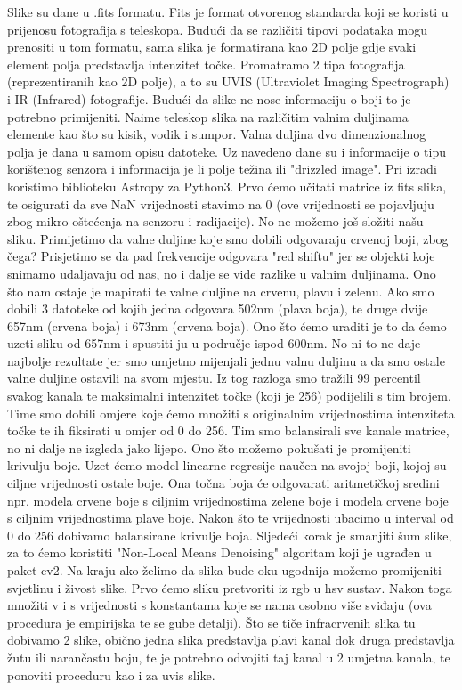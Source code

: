\documentclass[conference]{IEEEtran}
\begin{document}
Slike su dane u .fits formatu. Fits je format otvorenog standarda koji se koristi u prijenosu fotografija s teleskopa. Budući da se različiti tipovi podataka mogu prenositi u tom formatu, sama slika je formatirana kao 2D polje gdje svaki element polja predstavlja intenzitet točke. Promatramo 2 tipa fotografija (reprezentiranih kao 2D polje), a to su UVIS (Ultraviolet Imaging Spectrograph) i IR (Infrared) fotografije. Budući da slike ne nose informaciju o boji to je potrebno primijeniti. Naime teleskop slika na različitim valnim duljinama elemente kao što su kisik, vodik i sumpor. Valna duljina dvo dimenzionalnog polja je dana u samom opisu datoteke. Uz navedeno dane su i informacije o tipu korištenog senzora i informacija je li polje težina ili "drizzled image". Pri izradi koristimo biblioteku Astropy za Python3. Prvo ćemo učitati matrice iz fits slika, te osigurati da sve NaN vrijednosti stavimo na 0 (ove vrijednosti se pojavljuju zbog mikro oštećenja na senzoru i radijacije). No ne možemo još složiti našu sliku. Primijetimo da valne duljine koje smo dobili odgovaraju crvenoj boji, zbog čega? Prisjetimo se da pad frekvencije odgovara "red shiftu" jer se objekti koje snimamo udaljavaju od nas, no i dalje se vide razlike u valnim duljinama. Ono što nam ostaje je mapirati te valne duljine na crvenu, plavu i zelenu. Ako smo dobili 3 datoteke od kojih jedna odgovara 502nm (plava boja), te druge dvije 657nm (crvena boja) i 673nm (crvena boja). Ono što ćemo uraditi je to da ćemo uzeti sliku od 657nm i spustiti ju u područje ispod 600nm. No ni to ne daje najbolje rezultate jer smo umjetno mijenjali jednu valnu duljinu a da smo ostale valne duljine ostavili na svom mjestu. Iz tog razloga smo tražili 99 percentil svakog kanala te maksimalni intenzitet točke (koji je 256) podijelili s tim brojem. Time smo dobili omjere koje ćemo množiti s originalnim vrijednostima intenziteta točke te ih fiksirati u omjer od 0 do 256. Tim smo balansirali sve kanale matrice, no ni dalje ne izgleda jako lijepo. Ono što možemo pokušati je promijeniti krivulju boje. Uzet ćemo model linearne regresije naučen na svojoj boji, kojoj su ciljne vrijednosti ostale boje. Ona točna boja će odgovarati aritmetičkoj sredini npr. modela crvene boje s ciljnim vrijednostima zelene boje i modela crvene boje s ciljnim vrijednostima plave boje. Nakon što te vrijednosti ubacimo u interval od 0 do 256 dobivamo balansirane krivulje boja. Sljedeći korak je smanjiti šum slike, za to ćemo koristiti "Non-Local Means Denoising" algoritam koji je ugrađen u paket cv2. Na kraju ako želimo da slika bude oku ugodnija možemo promijeniti svjetlinu i živost slike. Prvo ćemo sliku pretvoriti iz rgb u hsv sustav. Nakon toga množiti v i s vrijednosti s konstantama koje se nama osobno više sviđaju (ova procedura je empirijska te se gube detalji). Što se tiče infracrvenih slika tu dobivamo 2 slike, obično jedna slika predstavlja plavi kanal dok druga predstavlja žutu ili narančastu boju, te je potrebno odvojiti taj kanal u 2 umjetna kanala, te ponoviti proceduru kao i za uvis slike.
\end{document}
